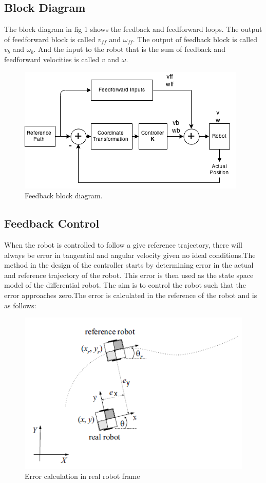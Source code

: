 \documentclass[conference]{IEEEtran}
\begin{document}
\subsection{Block Diagram}
The block diagram in fig 1 shows the feedback and feedforward loops. The output of feedforward block is called $v_{ff}$ and $\omega_{ff}$.
The output of feedback block is called $v_{b}$ and $\omega_{b}$. And the input to the robot that is the sum of feedback and feedforward velocities is called $v$ and $\omega$.
\begin{figure}[!t]
\centering
\includegraphics[scale=0.63]{block_diagram}
\caption{Feedback block diagram.}
\end{figure}
\subsection{Feedback Control}
When the robot is controlled to follow a give reference trajectory, there will always be error in tangential and angular velocity given no ideal conditions.The 
method in the design of the controller starts by determining error in the actual and reference trajectory of the robot. This error is then used as the state space 
model of the differential robot. The aim is to control the robot such that the error approaches zero.The error
is calculated in the reference of the robot and is as follows: 


\begin{figure}[!t]
\centering
\includegraphics[scale=0.6]{transformation}
\caption{Error calculation in real robot frame \cite{XingPGuo}}
\end{figure}
\end{document}
